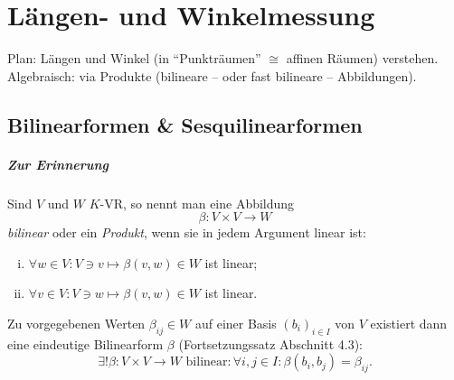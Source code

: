 \chapter{Längen- und Winkelmessung}
Plan: 
	Längen und Winkel (in "`Punkträumen"' $ \cong $ affinen Räumen) verstehen.\\
Algebraisch:
	via Produkte (bilineare -- oder fast bilineare -- Abbildungen).
	
%

\section{Bilinearformen \& Sesquilinearformen}
\paragraph{Zur Erinnerung}
	Sind $ V $ und  $W$ $ K $-VR, so nennt man eine Abbildung
		\[ \beta: V\times V\to W \]
	\emph{bilinear} oder ein \emph{Produkt}, wenn sie in jedem Argument linear ist:
		\begin{enumerate}[(i)]
			\item $ \forall w\in V :V\ni v \mapsto \beta(v,w)\in W $ ist linear;
			\item $ \forall v\in V: V\ni w\mapsto \beta(v,w)\in W $ ist linear.
		\end{enumerate}
	Zu vorgegebenen Werten $ \beta_{ij} \in W$ auf einer Basis $ (b_i)_{i\in I} $ von $ V $ existiert dann eine eindeutige Bilinearform $ \beta $ (Fortsetzungssatz Abschnitt 4.3):
		\[ \exists! \beta:V\times V\to W \text{ bilinear}: \forall i,j\in I: \beta(b_i,b_j) = \beta_{ij}. \]
